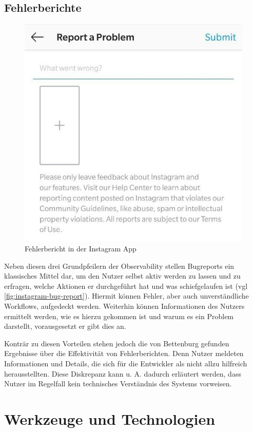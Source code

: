 \subsection{Fehlerberichte}

\begin{figure}
\centering
\includegraphics[width=\linewidth]{img/instagram-feedback/instagram-feedback.jpg}
\caption{Fehlerbericht in der Instagram App \cite{Instagram}}
\label{fig:instagram-bug-report}
\end{figure}

Neben diesen drei Grundpfeilern der Observability stellen Bugreports ein klassisches Mittel dar, um den Nutzer selbst aktiv werden zu lassen und zu erfragen, welche Aktionen er durchgeführt hat und was schiefgelaufen ist (vgl \autoref{fig:instagram-bug-report}). Hiermit können Fehler, aber auch unverständliche Workflows, aufgedeckt werden. Weiterhin können Informationen des Nutzers ermittelt werden, wie es hierzu gekommen ist und warum es ein Problem darstellt, vorausgesetzt er gibt dies an.

Konträr zu diesen Vorteilen stehen jedoch die von Bettenburg \etal \cite{WhatMakesAGoodBugReport} gefunden Ergebnisse über die Effektivität von Fehlerberichten. Denn Nutzer meldeten Informationen und Details, die sich für die Entwickler als nicht allzu hilfreich herausstellten. Diese Diskrepanz kann u. A. dadurch erläutert werden, dass Nutzer im Regelfall kein technisches Verständnis des Systems vorweisen.



\section{Werkzeuge und Technologien}
\label{sec:werkzeuge-und-technologien}
